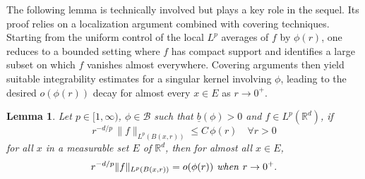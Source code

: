 \documentclass[a4paper,10pt]{article}
\theoremstyle{thmstyleone}%
\theoremstyle{thmstyletwo}%
\newtheorem{lemma}{Lemma}%
\theoremstyle{thmstylethree}%
\begin{document}
\medskip
\noindent
The following lemma is technically involved but plays a key role in the sequel. 
Its proof relies on a localization argument combined with covering techniques. 
Starting from the uniform control of the local $L^p$ averages of $f$ by $\phi(r)$, 
one reduces to a bounded setting where $f$ has compact support and identifies 
a large subset on which $f$ vanishes almost everywhere. Covering arguments 
then yield suitable integrability estimates for a singular kernel involving 
$\phi$, leading to the desired $o(\phi(r))$ decay for almost every $x\in E$ 
as $r\to0^+$.


\begin{lemma}\label{lemme 2 Rademacher}
Let $p\in [1,\infty)$, $\phi\in\mathcal{B}$ such that $\underline{b}(\phi)>0$ and $f\in L^p(\mathbb{R}^d)$, if 
\[r^{-d/p}\,\|f\|_{L^p(B(x,r))}\leq C\,\phi(r)\quad\forall r>0\]
for all $x$ in a measurable set $E$ of $\mathbb{R}^d$, then for almost all $x\in E$,
\[r^{-d/p}\|f\|_{L^p(B(x,r))}= o(\phi(r))\text{\emph{ when }} r\rightarrow 0^+.\]
\end{lemma}
\end{document}

